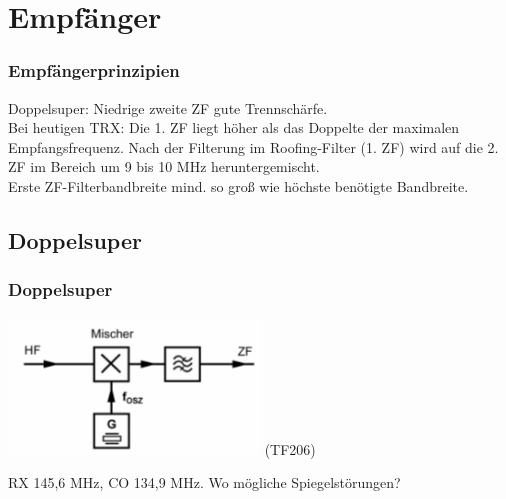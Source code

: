 \section{Empfänger}

\begin{frame}
    \frametitle{Empfängerprinzipien}

    Doppelsuper: Niedrige zweite ZF gute Trennschärfe. \\[2em]

    Bei heutigen TRX: Die 1. ZF liegt höher als das Doppelte der maximalen
    Empfangsfrequenz. Nach der Filterung im Roofing-Filter (1. ZF) wird auf die
    2. ZF im Bereich um 9 bis 10 MHz heruntergemischt. \\[2em]

    Erste ZF-Filterbandbreite mind. so groß wie höchste benötigte Bandbreite.

\end{frame}

\subsection{Doppelsuper}

\begin{frame}
    \frametitle{Doppelsuper}

    \begin{center}
        \includegraphics[width=0.5\textwidth]{a13/TF206.png}
        \tiny (TF206)
    \end{center}

    RX 145,6 MHz, CO 134,9 MHz. Wo mögliche Spiegelstörungen?
    

\end{frame}

